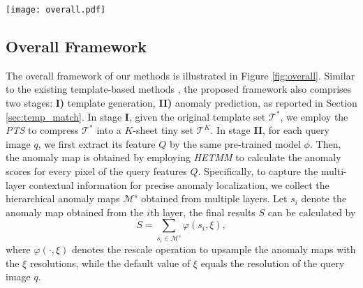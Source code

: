 \documentclass[default,iicol]{sn-jnl}\usepackage[algo2e,ruled,linesnumbered]{algorithm2e}
\theoremstyle{thmstyleone}\newtheorem{theorem}{Theorem}\newtheorem{proposition}[theorem]{Proposition}
\theoremstyle{thmstyletwo}\newtheorem{example}{Example}\newtheorem{remark}{Remark}
\theoremstyle{thmstylethree}\newtheorem{definition}{Definition}
\begin{document}
\begin{figure*}[!t]
    \centering
    \texttt{[image: overall.pdf]}
    \caption{The overall framework of our methods.
    In stage \textbf{I}, the original template set $\mathcal{T}^{*}$ is the aggregation of the features extracted from the collected $N$ nominal-only images $\mathcal{Z}$ by a pre-trained backbone $\phi$.
    To streamline $\mathcal{T}^{*}$ into a tiny set $\mathcal{T}^{K}$ with $K$ sheets ($N\ge K$), \textit{PTS} selects $K$ significant prototypes from $\mathcal{T}^{*}$ in each pixel coordinate.
    In stage \textbf{II}, given a query image $q$, we first extract its feature $Q$ by the same pre-trained backbone $\phi$ and then employ \textit{HETMM} to obtain the corresponding anomaly map.
    }
    \label{fig:overall}
\end{figure*}

\subsection{Overall Framework}
The overall framework of our methods is illustrated in Figure \ref{fig:overall}.
Similar to the existing template-based methods \cite{SPADE,patchcore}, the proposed framework also comprises two stages: \textbf{I)} template generation, \textbf{II)} anomaly prediction, as reported in Section \ref{sec:temp_match}.
In stage \textbf{I}, given the original template set $\mathcal{T}^{*}$, we employ the \textit{PTS} to compress $\mathcal{T}^{*}$ into a $K$-sheet tiny set $\mathcal{T}^{K}$.
In stage \textbf{II}, for each query image $q$, we first extract its feature $Q$ by the same pre-trained model $\phi$.
Then, the anomaly map is obtained by employing \textit{HETMM} to calculate the anomaly scores for every pixel of the query features $Q$.
Specifically, to capture the multi-layer contextual information for precise anomaly localization, we collect the hierarchical anomaly maps $\mathcal{M}^{s}$ obtained from multiple layers.
Let $s_{i}$ denote the anomaly map obtained from the $i$th layer, the final results $S$ can be calculated by
\begin{equation}
    S = \sum_{s_{i}\in \mathcal{M}^{s}}\varphi(s_{i},\xi),
    \label{eq:final}
\end{equation}
where $\varphi(\cdot, \xi)$ denotes the rescale operation to upsample the anomaly maps with the $\xi$ resolutions, while the default value of $\xi$ equals the resolution of the query image $q$.
\end{document}
